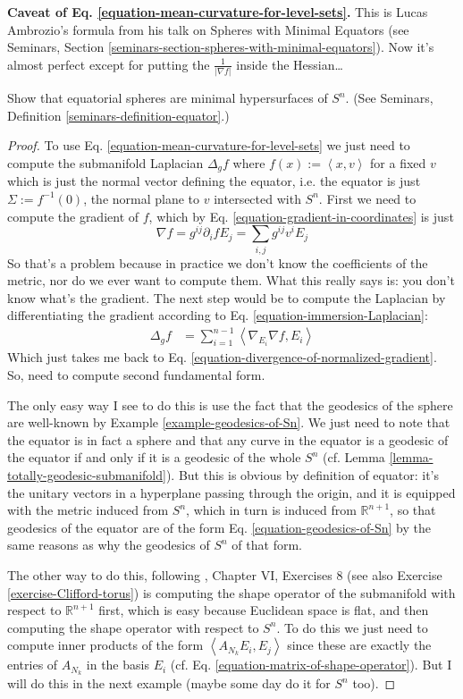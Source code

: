{\bf Caveat of Eq. \ref{equation-mean-curvature-for-level-sets}.} This is
Lucas Ambrozio's formula from his talk on Spheres with Minimal Equators (see
Seminars, Section
\ref{seminars-section-spheres-with-minimal-equators}). 
Now it's almost perfect except for
putting the $\frac{1}{|\nabla f|}$ inside the Hessian…

\begin{example}
\label{example-equatorial-spheres}
Show that equatorial spheres are minimal hypersurfaces of $S^n$. (See 
Seminars, Definition \ref{seminars-definition-equator}.)
\end{example}

\begin{proof}
To use Eq. \ref{equation-mean-curvature-for-level-sets} we just need to compute
the submanifold Laplacian $\Delta_gf$ where $f(x):=\left<x,v\right>$ for a fixed
$v$ which is just the normal vector defining the equator, i.e. the equator is
just  $\Sigma:=f^{-1}(0)$, the normal plane to $v$ intersected with $S^n$. First
we need to compute the gradient of $f$, which by Eq.
\ref{equation-gradient-in-coordinates} is just
$$
\nabla f=g^{ij}\partial_ifE_j=\sum_{i,j}g^{ij}v^iE_j
$$
So that's a problem because in practice we don't know the coefficients of the
metric, nor do we ever want to compute them. What this really says is: you don't
know what's the gradient. The next step would be to compute the Laplacian by
differentiating the gradient
according to Eq. \ref{equation-immersion-Laplacian}:
\begin{align*}
\Delta_gf&=\sum_{i=1}^{n-1}\left<\nabla_{E_i}\nabla f,E_i\right>
\end{align*}
Which just takes me back to Eq.
\ref{equation-divergence-of-normalized-gradient}. So, need
to compute second fundamental form.

The only easy way I see to do this is use the fact that the geodesics of the
sphere are well-known by Example \ref{example-geodesics-of-Sn}. We just need to
note that the equator is in fact a sphere and that any curve in the equator is a
geodesic of the equator if and only if it is a geodesic of the whole $S^n$ (cf.
Lemma \ref{lemma-totally-geodesic-submanifold}). But this is obvious by
definition of equator: it's the unitary vectors in a hyperplane passing through
the origin, and it is equipped with the metric induced from $S^n$, which in turn
is induced from $\mathbb{R}^{n+1}$, so that geodesics of the equator are of the
form Eq. \ref{equation-geodesics-of-Sn} by the same reasons as why the geodesics
of $S^n$ of that form.

The other way to do this, following \cite{doc}, Chapter VI, Exercises 8 (see also
Exercise \ref{exercise-Clifford-torus}) is computing the shape operator of the
submanifold with respect to $\mathbb{R}^{n+1}$ first, which is easy because
Euclidean space is flat, and then computing the shape operator with respect to
$S^n$. To do this we just need to compute inner products of the form
$\left<A_{N_k}E_i,E_j\right>$ since these are exactly the entries of $A_{N_k}$
in the basis $E_i$ (cf. Eq. \ref{equation-matrix-of-shape-operator}). But I will
do this in the next example (maybe some day do it for $S^n$ too).
\end{proof}

